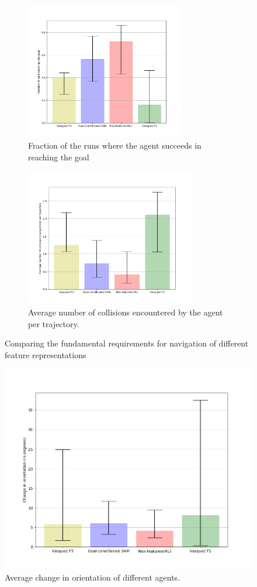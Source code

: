 \begin{figure}[!htbp]
	\begin{subfigure}{.5\textwidth}
		\centering
		\includegraphics[width=\linewidth, height=6cm]{plots/ucy_inter_irl_new/goal_reached_ucy_inter_irl.png}
		\caption{Fraction of the runs where the agent succeeds in reaching the goal}
		\label{fig:inter_IRL-goal_reached}
	\end{subfigure}
	\begin{subfigure}{.5\textwidth}
		\centering
		\includegraphics[width=\linewidth, height=6cm]{plots/ucy_inter_irl_new/count_collisions_ucy_inter_irl.png}
		\caption{Average number of collisions encountered by the agent per trajectory.}
		\label{fig:inter_IRL-collision_counts}
	\end{subfigure}
	\caption{Comparing the fundamental requirements for navigation of different feature representations }
\end{figure}

\begin{figure}[htbp]
	\centering
	\includegraphics[width=0.7\linewidth]{plots/ucy_inter_irl_new/compute_trajectory_smoothness_ucy_inter_irl.png}
	\caption{Average change in orientation of different agents.}
	\label{fig:inter_IRL-change_in_orientation_avg}
\end{figure}

